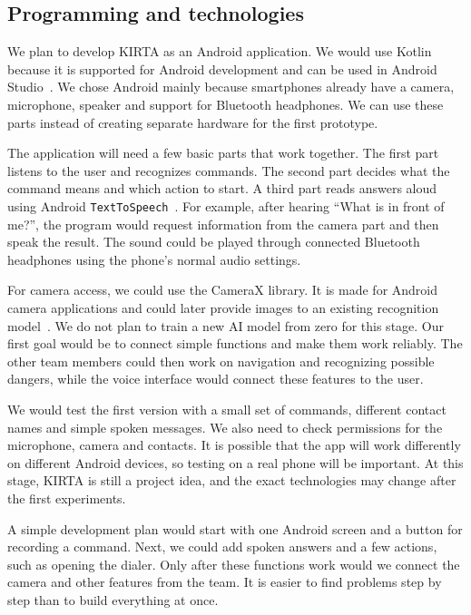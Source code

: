 \documentclass[10pt,twoside,english,a4paper]{article}
\begin{document}
\subsection*{Programming and technologies}

We plan to develop KIRTA as an Android application. We would use Kotlin because it is supported for Android development and can be used in Android Studio~\cite{androidkotlin}. We chose Android mainly because smartphones already have a camera, microphone, speaker and support for Bluetooth headphones. We can use these parts instead of creating separate hardware for the first prototype.

The application will need a few basic parts that work together. The first part listens to the user and recognizes commands. The second part decides what the command means and which action to start. A third part reads answers aloud using Android \texttt{TextToSpeech}~\cite{androidtts}. For example, after hearing ``What is in front of me?'', the program would request information from the camera part and then speak the result. The sound could be played through connected Bluetooth headphones using the phone's normal audio settings.

For camera access, we could use the CameraX library. It is made for Android camera applications and could later provide images to an existing recognition model~\cite{androidcamerax}. We do not plan to train a new AI model from zero for this stage. Our first goal would be to connect simple functions and make them work reliably. The other team members could then work on navigation and recognizing possible dangers, while the voice interface would connect these features to the user.

We would test the first version with a small set of commands, different contact names and simple spoken messages. We also need to check permissions for the microphone, camera and contacts. It is possible that the app will work differently on different Android devices, so testing on a real phone will be important. At this stage, KIRTA is still a project idea, and the exact technologies may change after the first experiments.

A simple development plan would start with one Android screen and a button for recording a command. Next, we could add spoken answers and a few actions, such as opening the dialer. Only after these functions work would we connect the camera and other features from the team. It is easier to find problems step by step than to build everything at once.
\end{document}
